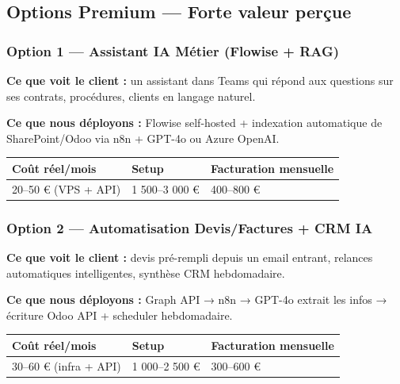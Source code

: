 \subsection{Options Premium — Forte valeur perçue}

\subsubsection{Option 1 — Assistant IA Métier (Flowise + RAG)}

\textbf{Ce que voit le client :} un assistant dans Teams qui répond aux questions sur ses contrats, procédures, clients en langage naturel.

\textbf{Ce que nous déployons :} Flowise self-hosted + indexation automatique de SharePoint/Odoo via n8n + GPT-4o ou Azure OpenAI.

\begin{table}[htbp]
  \centering\renewcommand{\arraystretch}{1.3}
  \begin{tabularx}{\textwidth}{X X X}
    \toprule
    \textbf{Coût réel/mois} & \textbf{Setup} & \textbf{Facturation mensuelle} \\
    \midrule
    20–50 € (VPS + API) & 1 500–3 000 € & 400–800 € \\
    \bottomrule
  \end{tabularx}
\end{table}

\subsubsection{Option 2 — Automatisation Devis/Factures + CRM IA}

\textbf{Ce que voit le client :} devis pré-rempli depuis un email entrant, relances automatiques intelligentes, synthèse CRM hebdomadaire.

\textbf{Ce que nous déployons :} Graph API → n8n → GPT-4o extrait les infos → écriture Odoo API + scheduler hebdomadaire.

\begin{table}[htbp]
  \centering\renewcommand{\arraystretch}{1.3}
  \begin{tabularx}{\textwidth}{X X X}
    \toprule
    \textbf{Coût réel/mois} & \textbf{Setup} & \textbf{Facturation mensuelle} \\
    \midrule
    30–60 € (infra + API) & 1 000–2 500 € & 300–600 € \\
    \bottomrule
  \end{tabularx}
\end{table}

